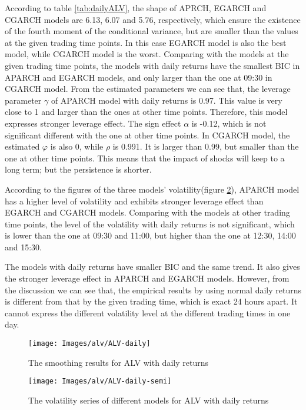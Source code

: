 According to table \ref{tab:dailyALV}, the shape of APRCH, EGARCH and CGARCH models are 6.13, 6.07 and 5.76, respectively, which ensure the existence of the fourth moment of the conditional variance, but are smaller than the values at the given trading time points. In this case EGARCH model is also the best model, while CGARCH model is the worst. Comparing with the models at the given trading time points, the models with daily returns have the smallest BIC in APARCH and EGARCH models, and only larger than the one at 09:30 in CGARCH model. From the estimated parameters we can see that, the leverage parameter $\gamma$ of APARCH model with daily returns is 0.97. This value is very close to 1 and larger than the ones at other time points. Therefore, this model expresses stronger leverage effect. The sign effect $\alpha$ is -0.12, which is not significant different with the one at other time points. In CGARCH model, the estimated $\varphi$ is also 0, while $\rho$ is 0.991. It is larger than 0.99, but smaller than the one at other time points. This means that the impact of shocks will keep to a long term; but the persistence is shorter.

According to the figures of the three models' volatility(figure \ref{fig:ALVdailysemi}), APARCH model has a higher level of volatility and exhibits stronger leverage effect than EGARCH and CGARCH models. Comparing with the models at other trading time points, the level of the volatility with daily returns is not significant, which is lower than the one at 09:30 and 11:00, but higher than the one at 12:30, 14:00 and 15:30.

The models with daily returns have smaller BIC and the same trend. It also gives the stronger leverage effect in APARCH and EGARCH models. However, from the discussion we can see that, the empirical results by using normal daily returns is different from that by the given trading time, which is exact 24 hours apart. It cannot express the different volatility level at the different trading times in one day.

\begin{figure}[!htbp]
	\centering
	\texttt{[image: Images/alv/ALV-daily]}
	\caption[The smoothing results for ALV with daily returns]{The smoothing results for ALV with daily returns}
	\label{fig:ALVdaily}
\end{figure}


\begin{figure}[!htbp]
	\centering
	\texttt{[image: Images/alv/ALV-daily-semi]}
	\caption[The volatility series of different models for ALV with daily returns]{The volatility series of different models for ALV with daily returns}
	\label{fig:ALVdailysemi}
\end{figure}




